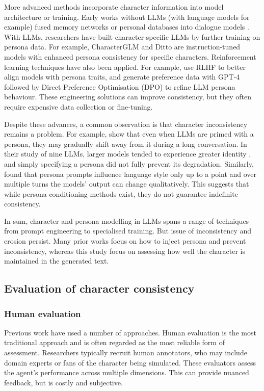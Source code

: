 \documentclass{article}
\begin{document}
More advanced methods incorporate character information into model architecture or training. Early works without LLMs (with language models for example) fused memory networks or personal databases into dialogue models \citep{zhang2018personalizing}. With LLMs, researchers have built character-specific LLMs by further training on persona data. For example, CharacterGLM \citep{zhou2023characterglm} and Ditto \citep{li2021ditto, lu2024large} are instruction-tuned models with enhanced persona consistency for specific characters. Reinforcement learning techniques have also been applied. For example, \cite{shea2023building} use RLHF to better align models with persona traits, and \cite{chen2025compress} generate preference data with GPT-4 followed by Direct Preference Optimisation (DPO) to refine LLM persona behaviour. These engineering solutions can improve consistency, but they often require expensive data collection or fine-tuning.

Despite these advances, a common observation is that character inconsistency remains a problem. For example, \cite{choi2024examining} show that even when LLMs are primed with a persona, they may gradually shift away from it during a long conversation. In their study of nine LLMs, larger models tended to experience greater identity , and simply specifying a persona did not fully prevent its degradation. Similarly, \citep{frisch2024llm} found that persona prompts influence language style only up to a point and over multiple turns the models' output can change qualitatively. This suggests that while persona conditioning methods exist, they do not guarantee indefinite consistency.

In sum, character and persona modelling in LLMs spans a range of techniques from prompt engineering to specialised training. But issue of inconsistency and erosion persist. Many prior works focus on how to inject persona and prevent inconsistency, whereas this study focus on assessing how well the character is maintained in the generated text.

\subsection{Evaluation of character consistency}

\subsubsection{Human evaluation}

Previous work have used a number of approaches. Human evaluation is the most traditional approach and is often regarded as the most reliable form of assessment. Researchers typically recruit human annotators, who may include domain experts or fans of the character being simulated. These evaluators assess the agent’s performance across multiple dimensions. This can provide nuanced feedback, but is costly and subjective. 
\end{document}
